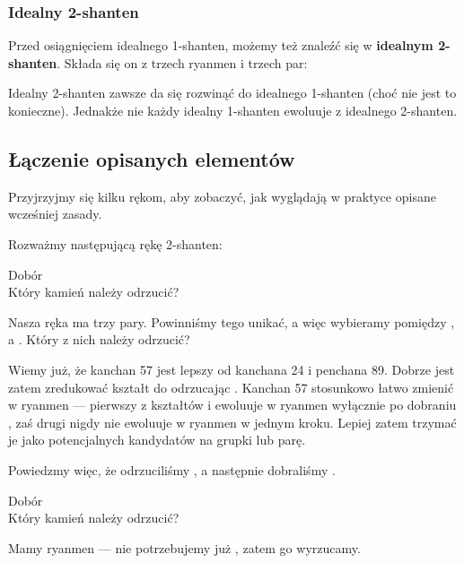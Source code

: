\subsubsection{Idealny 2-{\jap shanten}}
Przed osiągnięciem idealnego 1-{\jap shanten}, możemy też znaleźć się w {\bf idealnym 2-{\jap shanten}}.
Składa się on z trzech {\jap ryanmen} i trzech par:
\begin{screen}
\end{screen}
Idealny 2-{\jap shanten} zawsze da się rozwinąć do idealnego 1-{\jap shanten} (choć nie jest to konieczne).
Jednakże nie każdy idealny 1-{\jap shanten} ewoluuje z idealnego 2-{\jap shanten}.

\newpage
\subsection{Łączenie opisanych elementów}\label{sec:ptat}

Przyjrzyjmy się kilku rękom, aby zobaczyć, jak wyglądają w praktyce opisane wcześniej zasady.

Rozważmy następującą rękę 2-{\jap shanten}:
\begin{screen}
	\vspace{-15pt}\hfill{\footnotesize{Dobór~~~~~~~~~}}\\
	\vspace{-2pt}Który kamień należy odrzucić?\vspace{-5pt}
\end{screen}
Nasza ręka ma trzy pary.
Powinniśmy tego unikać, a więc wybieramy pomiędzy ,  a .
Który z nich należy odrzucić?

\bigskip
Wiemy już, że {\jap kanchan} 57 jest lepszy od {\jap kanchan}a 24 i {\jap penchan}a 89.
Dobrze jest zatem zredukować kształt  do  odrzucając .
{\jap Kanchan} 57 stosunkowo łatwo zmienić w {\jap ryanmen} --- pierwszy z kształtów  i  ewoluuje w {\jap ryanmen} wyłącznie po dobraniu , zaś drugi nigdy nie ewoluuje w {\jap ryanmen} w jednym kroku.
Lepiej zatem trzymać je jako potencjalnych kandydatów na grupki lub parę.

\bigskip
Powiedzmy więc, że odrzuciliśmy , a następnie dobraliśmy .
\begin{screen}
	\vspace{-15pt}\hfill{\footnotesize{Dobór~~~~~~~~~}}\\
	\vspace{-2pt}Który kamień należy odrzucić?\vspace{-5pt}
\end{screen}
Mamy {\jap ryanmen}  --- nie potrzebujemy już , zatem go wyrzucamy.

